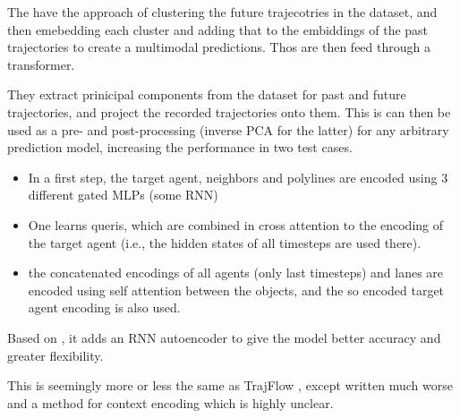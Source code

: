 
\cite{shi2023trajectory} The have the approach of clustering the future trajecotries in the dataset, and then emebedding each cluster and adding that to the embiddings of the past trajectories to create a multimodal predictions. Thos are then feed through a transformer.


\cite{bae2023eigentrajectory} They extract prinicipal components from the dataset for past and future trajectories, and project the recorded trajectories onto them. This is can then be used as a pre- and post-processing (inverse PCA for the latter) for any arbitrary prediction model, increasing the performance in two test cases.


\cite{wang2023prophnet}  
\begin{itemize}
    \item In a first step, the target agent, neighbors and polylines are encoded using 3 different gated MLPs (some RNN)
    \item One learns queris, which are combined in cross attention to the encoding of the target agent (i.e., the hidden states of all timesteps are used there).
    \item the concatenated encodings of all agents (only last timesteps) and lanes are encoded using self attention between the objects, and the so encoded target agent encoding is also used.
\end{itemize}



\cite{meszaros2024trajflow} Based on \cite{scholler2021flomo}, it adds an RNN autoencoder to give the model better accuracy and greater flexibility.


\cite{stefani2024mapflow} This is seemingly more or less the same as TrajFlow \cite{meszaros2024trajflow}, except written much worse and a method for context encoding which is highly unclear.




